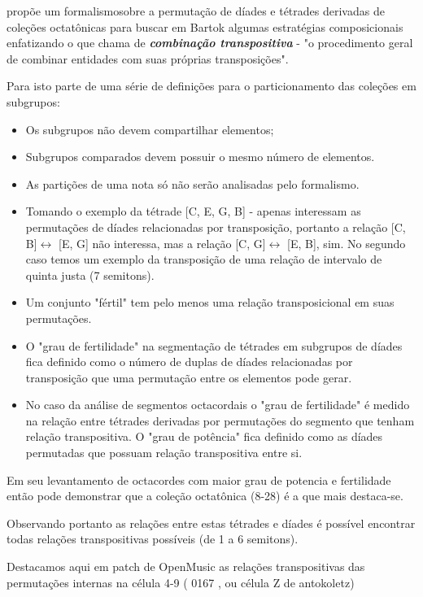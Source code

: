 \documentclass[
	12pt,				%
	openright,			%
	twoside,			%
	a4paper,			%
	english,			%
	french,				%
	spanish,			%
	brazil				%
	]{abntex2}
\begin{document}
 propõe um formalismosobre a permutação de díades e tétrades derivadas de coleções octatônicas para buscar em Bartok algumas estratégias composicionais enfatizando o que chama de \textbf{\textit{combinação transpositiva}} - "o procedimento geral de combinar entidades com suas próprias transposições".\cite[ p.x]{cohn1991bartok}

Para isto parte de uma série de definições para o particionamento das coleções em subgrupos:

\begin{itemize}


\item Os subgrupos não devem compartilhar elementos;
\item Subgrupos comparados devem possuir o mesmo número de elementos. 
\item As partições de uma nota só não serão analisadas pelo formalismo.
\item Tomando o exemplo da tétrade [C, E, G, B] - apenas interessam as permutações de díades relacionadas por transposição, portanto a relação [C, B]$\leftrightarrow $ [E, G] não interessa, mas a relação [C, G]$\leftrightarrow $ [E, B], sim. No segundo caso temos um exemplo da transposição de uma relação de intervalo de quinta justa (7 semitons).
\item Um conjunto "fértil" tem pelo menos uma relação transposicional em suas permutações.
\item O "grau de fertilidade" na segmentação de tétrades em subgrupos de díades fica definido como o número de duplas de díades relacionadas por transposição que uma permutação entre os elementos pode gerar.
\item No caso da análise de segmentos octacordais o "grau de fertilidade" é medido na relação entre tétrades derivadas por permutações do segmento que tenham relação transpositiva. O "grau de potência" fica definido como as díades permutadas que possuam relação transpositiva entre si.

\end{itemize}


Em seu levantamento de octacordes com maior grau de potencia e fertilidade \cite{cohn1991bartok} então pode demonstrar que a coleção octatônica (8-28) é a que mais destaca-se.


Observando portanto as relações entre estas tétrades e díades é possível encontrar todas relações transpositivas possíveis (de 1 a 6 semitons).


Destacamos aqui em patch de OpenMusic as relações transpositivas das permutações internas na célula 4-9 ( 0167 , ou célula Z de antokoletz)
\end{document}

